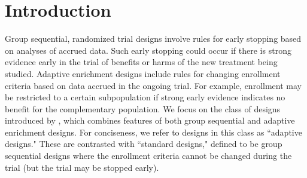 \documentclass[article]{jss}
\newcommand{\htx}[2]{\hspace{ #1 cm} \text{ #2 } }
\newcommand{\lr}[1]{\left( #1 \right) } %
\begin{document}





\section*{Introduction} \label{sec:intro}
Group sequential, randomized trial designs involve rules for early stopping based on analyses of accrued data. Such early stopping could occur if there is strong evidence early in the trial of benefits or harms of the new treatment being studied. Adaptive enrichment designs include rules for changing enrollment criteria based on data accrued in the ongoing trial. For example, enrollment may be restricted to a certain subpopulation if strong early evidence indicates no benefit for the complementary population.
We focus on the  class of designs introduced by \cite{Rosenblum2013AdaptMISTIE}, which combines features of both group sequential and adaptive enrichment designs. For conciseness, we refer to designs in this class as  ``adaptive designs."
These are contrasted with ``standard designs," 
defined to  be group sequential designs where the enrollment criteria cannot be changed during the trial (but the trial may be stopped early). 
\end{document}
